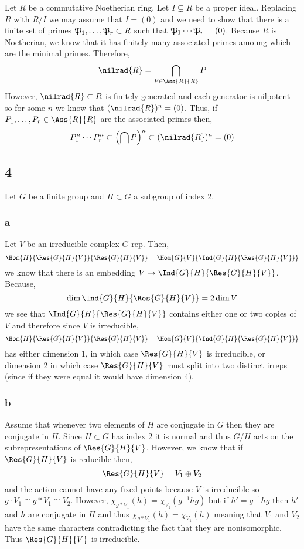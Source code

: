 \documentclass[12pt]{article}
\begin{document}
Let $R$ be a commutative Noetherian ring. Let $I \subsetneq R$ be a proper ideal. Replacing $R$ with $R / I$ we may assume that $I = (0)$ and we need to show that there is a finite set of primes $\P_1, \dots, \P_r \subset R$ such that $\P_1 \cdots \P_r = (0)$. 
Because $R$ is Noetherian, we know that it has finitely many associated primes amoung which are the minimal primes. Therefore,
\[ \nilrad{R} = \bigcap_{P \in \Ass{R}{R}} P \]
However, $\nilrad{R} \subset R$ is finitely generated and each generator is nilpotent so for some $n$ we know that $(\nilrad{R})^n = (0)$. Thus, if $P_1, \dots, P_r \in \Ass{R}{R}$ are the associated primes then,
\[ P_1^n \cdots P_r^n \subset \left( \bigcap P \right)^n \subset (\nilrad{R})^n = (0) \]

\subsection{4}

Let $G$ be a finite group and $H \subset G$ a subgroup of index $2$.

\subsubsection{a}


Let $V$ be an irreducible complex $G$-rep. Then,
\[ \Hom{H}{\Res{G}{H}{V}}{\Res{G}{H}{V}} = \Hom{G}{V}{\Ind{G}{H}{\Res{G}{H}{V}}} \]
we know that there is an embedding $V \to \Ind{G}{H}{\Res{G}{H}{V}}$. Because,
\[ \dim{\Ind{G}{H}{\Res{G}{H}{V}}} = 2 \dim{V} \]
we see that $\Ind{G}{H}{\Res{G}{H}{V}}$ contains either one or two copies of $V$ and therefore since $V$ is irreducible,
\[ \Hom{H}{\Res{G}{H}{V}}{\Res{G}{H}{V}} = \Hom{G}{V}{\Ind{G}{H}{\Res{G}{H}{V}}} \]
has either dimension $1$, in which case $\Res{G}{H}{V}$ is irreducible, or dimension $2$ in which case $\Res{G}{H}{V}$ must split into two distinct irreps (since if they were equal it would have dimension $4$).

\subsubsection{b}

Assume that whenever two elements of $H$ are conjugate in $G$ then they are conjugate in $H$. Since $H \subset G$ has index $2$ it is normal and thus $G/H$ acts on the subrepresentations of $\Res{G}{H}{V}$. However, we know that if $\Res{G}{H}{V}$ is reducible then,
\[ \Res{G}{H}{V} = V_1 \oplus V_2 \]
and the action cannot have any fixed points because $V$ is irreducible so $g \cdot V_1 \cong g * V_1 \cong V_2$. However, $\chi_{g * V_1}(h) = \chi_{V_1}(g^{-1} h g)$ but if $h' = g^{-1} h g$ then $h'$ and $h$ are conjugate in $H$ and thus $\chi_{g * V_1}(h) = \chi_{V_1}(h)$ meaning that $V_1$ and $V_2$ have the same characters contradicting the fact that they are nonisomorphic. Thus $\Res{G}{H}{V}$ is irreducible.
\end{document}
